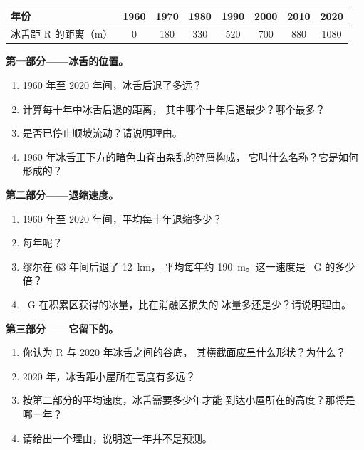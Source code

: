 \begin{problem}
\begin{center}
\smallskip
{\small
\begin{tabular}{|l|c|c|c|c|c|c|c|}
\hline
年份 & 1960 & 1970 & 1980 & 1990 & 2000 & 2010 & 2020 \\
\hline
冰舌距 R 的距离（m） & 0 & 180 & 330 & 520 & 700 & 880 & 1080 \\
\hline
\end{tabular}}
\end{center}

\noindent\textbf{第一部分——冰舌的位置。}\par\nopagebreak
\begin{enumerate}[beginpenalty=10000]
  \item 1960 年至 2020 年间，冰舌后退了多远？
  \item 计算每十年中冰舌后退的距离，
        其中哪个十年后退最少？哪个最多？
  \item {}是否已停止顺坡流动？请说明理由。
  \item 1960 年冰舌正下方的暗色山脊由杂乱的碎屑构成，
        它叫什么名称？它是如何形成的？
\end{enumerate}

\noindent\textbf{第二部分——退缩速度。}\par\nopagebreak
\begin{enumerate}[resume, beginpenalty=10000]
  \item 1960 年至 2020 年间，平均每十年退缩多少？
  \item 每年呢？
  \item 缪尔在 63 年间后退了 \qty{12}{km}，
        平均每年约 \qty{190}{m}。这一速度是
        ~G 的多少倍？
  \item {}~G 在积累区获得的冰量，比在消融区损失的
        冰量多还是少？请说明理由。
\end{enumerate}

\noindent\textbf{第三部分——它留下的。}\par\nopagebreak
\begin{enumerate}[resume, beginpenalty=10000]
  \item 你认为 R 与 2020 年冰舌之间的谷底，
        其横截面应呈什么形状？为什么？
  \item 2020 年，冰舌距小屋所在高度有多远？
  \item 按第二部分的平均速度，冰舌需要多少年才能
        到达小屋所在的高度？那将是哪一年？
  \item 请给出一个理由，说明这一年并不是预测。
\end{enumerate}
\end{problem}
